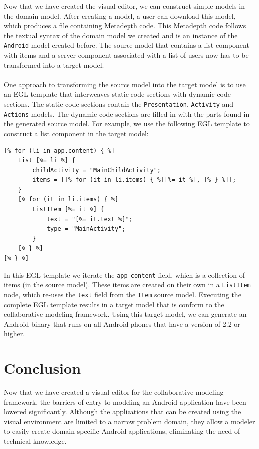 Now that we have created the visual editor, we can construct simple models in the domain model. After creating a model, a user can download this model, which produces a file containing Metadepth code. This Metadepth code follows the textual syntax of the domain model we created and is an instance of the \texttt{Android} model created before. The source model that contains a list component with items and a server component associated with a list of users now has to be transformed into a target model. \\ \\
One approach to transforming the source model into the target model is to use an EGL template that interweaves static code sections with dynamic code sections. The static code sections contain the \texttt{Presentation}, \texttt{Activity} and \texttt{Actions} models. The dynamic code sections are filled in with the parts found in the generated source model. For example, we use the following EGL template to construct a list component in the target model:
\begin{lstlisting}[label=target-model,caption=List component in the target model, captionpos=t]
[% for (li in app.content) { %]
	List [%= li %] {
		childActivity = "MainChildActivity";
		items = [[% for (it in li.items) { %][%= it %], [% } %]];
	}
	[% for (it in li.items) { %]
		ListItem [%= it %] {
			text = "[%= it.text %]";
			type = "MainActivity";
		}
	[% } %]
[% } %]
\end{lstlisting}
In this EGL template we iterate the \texttt{app.content} field, which is a collection of items (in the source model). These items are created on their own in a \texttt{ListItem} node, which re-uses the \texttt{text} field from the \texttt{Item} source model. Executing the complete EGL template results in a target model that is conform to the collaborative modeling framework. Using this target model, we can generate an Android binary that runs on all Android phones that have a version of 2.2 or higher.

\section{Conclusion}

Now that we have created a visual editor for the collaborative modeling framework, the barriers of entry to modeling an Android application have been lowered significantly. Although the applications that can be created using the visual environment are limited to a narrow problem domain, they allow a modeler to easily create domain specific Android applications, eliminating the need of technical knowledge.

